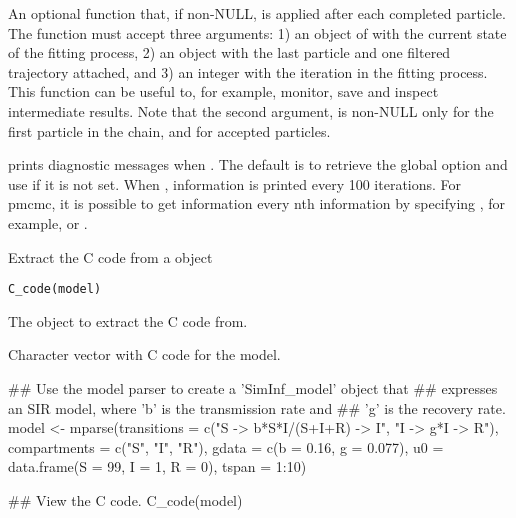 \documentclass[letterpaper]{book}
\begin{document}
\begin{Arguments}
\begin{ldescription}
\item[\code{post\_particle}] An optional function that, if non-NULL, is
applied after each completed particle. The function must
accept three arguments: 1) an object of 
with the current state of the fitting process, 2) an object
 with the last particle and one filtered
trajectory attached, and 3) an integer with the iteration in
the fitting process. This function can be useful to, for
example, monitor, save and inspect intermediate results. Note
that the second  argument, is non-NULL
only for the first particle in the chain, and for accepted
particles.

\item[\code{verbose}] prints diagnostic messages when . The
default is to retrieve the global option  and
use  if it is not set. When ,
information is printed every 100 iterations. For pmcmc, it is
possible to get information every nth information by
specifying , for example,  or
.
\end{ldescription}
\end{Arguments}
%
\begin{Description}
Extract the C code from a  object
\end{Description}
%
\begin{Usage}
\begin{verbatim}
C_code(model)
\end{verbatim}
\end{Usage}
%
\begin{Arguments}
\begin{ldescription}
\item[\code{model}] The  object to extract the C code
from.
\end{ldescription}
\end{Arguments}
%
\begin{Value}
Character vector with C code for the model.
\end{Value}
%
\begin{Examples}
\begin{ExampleCode}
## Use the model parser to create a 'SimInf_model' object that
## expresses an SIR model, where 'b' is the transmission rate and
## 'g' is the recovery rate.
model <- mparse(transitions = c("S -> b*S*I/(S+I+R) -> I", "I -> g*I -> R"),
                compartments = c("S", "I", "R"),
                gdata = c(b = 0.16, g = 0.077),
                u0 = data.frame(S = 99, I = 1, R = 0),
                tspan = 1:10)

## View the C code.
C_code(model)
\end{ExampleCode}
\end{Examples}
\end{document}
